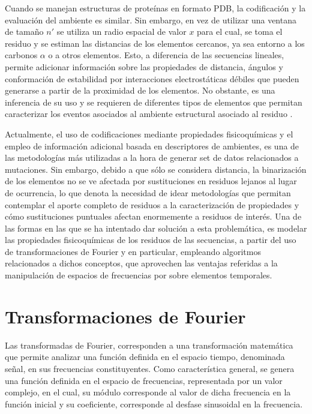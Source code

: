 Cuando se manejan estructuras de proteínas en formato PDB, la codificación y la evaluación del ambiente es similar. Sin embargo, en vez de utilizar una ventana de tamaño $n'$ se utiliza un radio espacial de valor $x$ para el cual, se toma el residuo y se estiman las distancias de los elementos cercanos, ya sea entorno a los carbonos $\alpha$ o a otros elementos. Esto, a diferencia de las secuencias lineales, permite adicionar información sobre las propiedades de distancia, ángulos y conformación de estabilidad por interacciones electrostáticas débiles que pueden generarse a partir de la proximidad de los elementos. No obstante, es una inferencia de su uso y se requieren de diferentes tipos de elementos que permitan caracterizar los eventos asociados al ambiente estructural asociado al residuo \cite{capriotti2008three}.

Actualmente, el uso de codificaciones mediante propiedades fisicoquímicas y el empleo de información adicional basada en descriptores de ambientes, es una de las metodologías más utilizadas a la hora de generar set de datos relacionados a mutaciones. Sin embargo, debido a que sólo se considera distancia, la binarización de los elementos no se ve afectada por sustituciones en residuos lejanos al lugar de ocurrencia, lo que denota la necesidad de idear metodologías que permitan contemplar el aporte completo de residuos a la caracterización de propiedades y cómo sustituciones puntuales afectan enormemente a residuos de interés. Una de las formas en las que se ha intentado dar solución a esta problemática, es modelar las propiedades fisicoquímicas de los residuos de las secuencias, a partir del uso de transformaciones de Fourier y en particular, empleando algoritmos relacionados a dichos conceptos, que aprovechen las ventajas referidas a la manipulación de espacios de frecuencias por sobre elementos temporales.

\section{Transformaciones de Fourier}

Las transformadas de Fourier, corresponden a una transformación matemática que permite analizar una función definida en el espacio tiempo, denominada señal, en sus frecuencias constituyentes. Como característica general, se genera una función definida en el espacio de frecuencias, representada por un valor complejo, en el cual, su módulo corresponde al valor de dicha frecuencia en la función inicial y su coeficiente, corresponde al desfase sinusoidal en la frecuencia.

